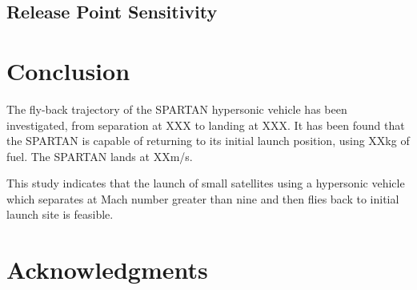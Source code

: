 \documentclass[conf]{new-aiaa}
\begin{document}
\subsection{Release Point Sensitivity}


\section{Conclusion}
The fly-back trajectory of the SPARTAN hypersonic vehicle has been investigated, from separation at XXX to landing at XXX. It has been found that the SPARTAN is capable of returning to its initial launch position, using XXkg of fuel. The SPARTAN lands at XXm/s.  

This study indicates that the launch of small satellites using a hypersonic vehicle which separates at Mach number greater than nine and then flies back to initial launch site is feasible. 

\section*{Acknowledgments}



\end{document}

